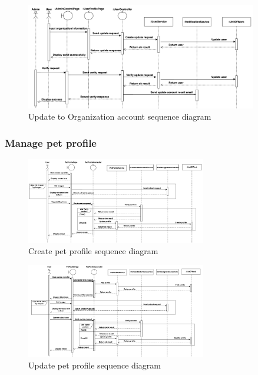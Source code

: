 \begin{figure}[H]
  \centering
  \includegraphics[width=0.9\textwidth]{Figures/update_org_seq.png}
  \caption{Update to Organization account sequence diagram}
  \label{fig:update-org-seq}
\end{figure}

\subsubsection{Manage pet profile}

\begin{figure}[H]
  \centering
  \includegraphics[angle=-90,width=0.7\textwidth]{Figures/manage_pet_seq.png}
  \caption{Create pet profile sequence diagram}
  \label{fig:manage-pet-seq}
\end{figure}
\clearpage
\begin{figure}[H]
  \centering
  \includegraphics[angle=-90,width=0.7\textwidth]{Figures/update_pet_profile_seq.png}
  \caption{Update pet profile sequence diagram}
  \label{fig:access-pet-seq}
\end{figure}
\clearpage

